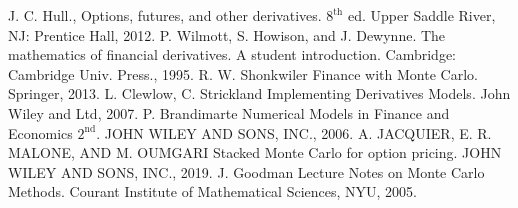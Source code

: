 \documentclass[12pt, a4paper]{report}
\begin{document}
	
	
	
	\tableofcontents
	\listoffigures
	\listoftables
	
	
    
	
	
	
	\appendix
	
	
	\begin{thebibliography}{99}
		 {J. C. Hull.}, Options, futures, and other derivatives. $8^{\text{th}}$ ed. Upper Saddle River, NJ: Prentice Hall, 2012. 
		 {P. Wilmott, S. Howison, and J. Dewynne.} The mathematics of financial derivatives. A student introduction. Cambridge: Cambridge Univ. Press., 1995.
		 {R. W. Shonkwiler} Finance with
		Monte Carlo. Springer, 2013.
		 {L. Clewlow, C. Strickland} Implementing Derivatives Models. John Wiley and Ltd, 2007.
		 {P. Brandimarte} Numerical Models in Finance and Economics $2^{\text{nd}}$. JOHN WILEY AND SONS, INC., 2006.
		 {A. JACQUIER, E. R. MALONE, AND M. OUMGARI} Stacked Monte Carlo for option pricing. JOHN WILEY AND SONS, INC., 2019.
		 {J. Goodman} Lecture Notes on Monte Carlo Methods. Courant Institute of Mathematical Sciences, NYU, 2005.
	\end{thebibliography}
	
\end{document}

